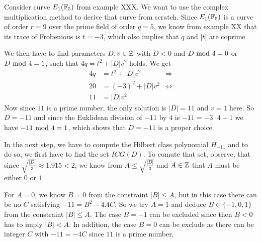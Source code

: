\begin{example} Consider curve $E_1(\mathbb{F}_5)$ from example XXX. We want to use the complex multiplication method to derive that curve from scratch. Since $E_1(\mathbb{F}_5)$ is a curve of order $r=9$ over the prime field of order $q=5$, we know from example XX that its trace of Frobenious is $t=-3$, which also implies that $q$ and $|t|$ are coprime.

We then have to find parameters $D,v\in\mathbb{Z}$ with $D<0$ and $D \text{ mod } 4=0$ or $D \text{ mod } 4=1$, such that $4q = t^2+ |D|v^2$ holds. We get
\begin{align*}
4q & = t^2+ |D|v^2 & \Rightarrow \\
20 & = (-3)^2 + |D|v^2 & \Leftrightarrow \\
11 & = |D|v^2
\end{align*}
Now since $11$ is a prime number, the only solution is $|D|=11$ and $v=1$ here. So $D=-11$ and since the Euklidean division of $-11$ by $4$ is $-11 = -3\cdot 4 +1$ we have $-11 \text{ mod } 4=1$, which shows that $D=-11$ is a proper choice.

In the next step, we have to compute the Hilbert class polynomial $H_{-11}$ and to do so, we first have to find the set $ICG(D)$. To comute that set, observe, that since $\sqrt{\frac{|D|}{3}}\approx 1.915<2$, we know from $A\leq \sqrt{\frac{|D|}{3}}$ and $A\in\mathbb{Z}$ that $A$ must be either $0$ or $1$.

For $A=0$, we know $B=0$ from the constraint $|B|\leq A$, but in this case there can be no $C$ satisfying $-11= B^2 -4AC$. So we try $A=1$ and deduce $B\in\{-1,0,1\}$ from the constraint $|B|\leq A$. The case $B=-1$ can be excluded since then $B<0$ has to imply $|B|<A$. In addition, the case $B=0$ can be exclude as there can be integer $C$ with $-11 = -4C$ since $11$ is a prime number.


\end{example}
